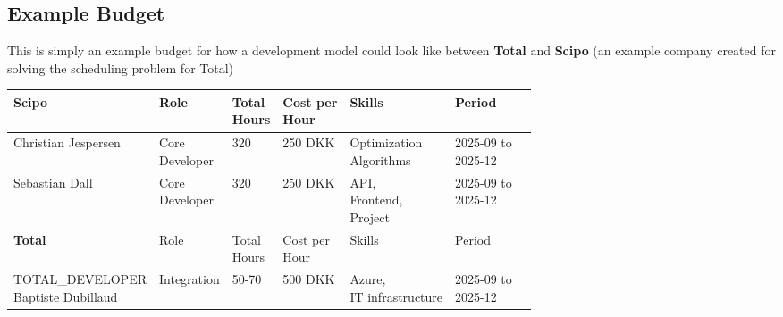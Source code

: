 \documentclass{article}
\begin{document}
\subsection{Example Budget}
This is simply an example budget for how a development model could look like between \textbf{Total} and \textbf{Scipo} (an example company created for solving the scheduling problem for Total)

\begin{table}[H]
\centering
\begin{tabular}{lllllll}
    \toprule
    \textbf{Scipo}                                                          & Role                            & \makecell[lt]{Total\\Hours} & \makecell[lt]{Cost per\\Hour}        & Skills                                                                  & Period                             &  \\
    \midrule
    Christian Jespersen                                                     & \makecell[lt]{Core\\Developer}  & 320                         & 250 DKK                              & \makecell[lt]{Optimization\\Algorithms}                                 & \makecell[lt]{2025-09 to\\2025-12} &  \\
    Sebastian Dall                                                          & \makecell[lt]{Core\\Developer}  & 320                         & 250 DKK                              & \makecell[lt]{API,\\Frontend,\\Project}                                 & \makecell[lt]{2025-09 to\\2025-12} &  \\
    \toprule
    \textbf{Total}                                                          & Role                            & \makecell[lt]{Total\\Hours} & \makecell[lt]{Cost per\\Hour}        & Skills                                                                  & Period                             &  \\
    \midrule
    \makecell[tl]{TOTAL\_DEVELOPER\\Baptiste Dubillaud}                     & Integration                     & 50-70                       & 500 DKK                              & \makecell[lt]{Azure,\\IT infrastructure}                                & \makecell[lt]{2025-09 to\\2025-12} &  \\

\end{tabular}
\end{table}
\end{document}

